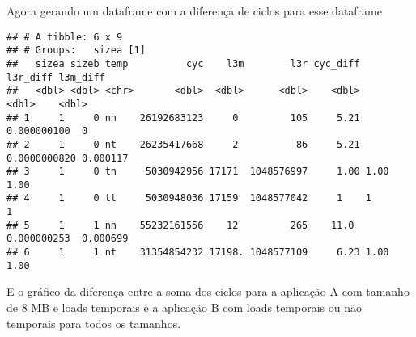 \documentclass[
]{article}
\newenvironment{Shaded}{\begin{snugshade}}{\end{snugshade}}
\newcommand{\CommentTok}[1]{\textcolor[rgb]{0.56,0.35,0.01}{\textit{#1}}}
\newcommand{\DataTypeTok}[1]{\textcolor[rgb]{0.13,0.29,0.53}{#1}}
\newcommand{\DecValTok}[1]{\textcolor[rgb]{0.00,0.00,0.81}{#1}}
\newcommand{\KeywordTok}[1]{\textcolor[rgb]{0.13,0.29,0.53}{\textbf{#1}}}
\newcommand{\NormalTok}[1]{#1}
\newcommand{\OperatorTok}[1]{\textcolor[rgb]{0.81,0.36,0.00}{\textbf{#1}}}
\newcommand{\StringTok}[1]{\textcolor[rgb]{0.31,0.60,0.02}{#1}}
\begin{document}
Agora gerando um dataframe com a diferença de ciclos para esse dataframe

\begin{Shaded}
\end{Shaded}

\begin{verbatim}
## # A tibble: 6 x 9
## # Groups:   sizea [1]
##   sizea sizeb temp          cyc    l3m        l3r cyc_diff     l3r_diff l3m_diff
##   <dbl> <dbl> <chr>       <dbl>  <dbl>      <dbl>    <dbl>        <dbl>    <dbl>
## 1     1     0 nn    26192683123     0         105     5.21 0.000000100  0       
## 2     1     0 nt    26235417668     2          86     5.21 0.0000000820 0.000117
## 3     1     0 tn     5030942956 17171  1048576997     1.00 1.00         1.00    
## 4     1     0 tt     5030948036 17159  1048577042     1    1            1       
## 5     1     1 nn    55232161556    12         265    11.0  0.000000253  0.000699
## 6     1     1 nt    31354854232 17198. 1048577109     6.23 1.00         1.00
\end{verbatim}

E o gráfico da diferença entre a soma dos ciclos para a aplicação A com
tamanho de 8 MB e loads temporais e a aplicação B com loads temporais ou
não temporais para todos os tamanhos.
\end{document}

